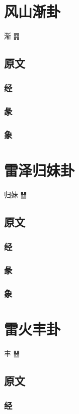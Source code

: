 \documentclass[12pt,oneside]{book}
\begin{document}
\chapter{风山渐卦}
渐 {\Large ䷴}
\section{原文}

\subsection{经}

\subsection{彖}

\subsection{象}


\chapter{雷泽归妹卦}
归妹 {\Large ䷵}
\section{原文}

\subsection{经}

\subsection{彖}

\subsection{象}

\chapter{雷火丰卦}
丰 {\Large ䷶}
\section{原文}

\subsection{经}
\end{document}
